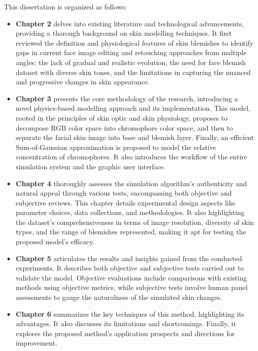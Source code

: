 \begin{spacing}{1.5}
This dissertation is organized as follows:
\begin{itemize}
    \item \textbf{Chapter 2} delves into existing literature and technological advancements, providing a thorough background on skin modelling techniques. It first reviewed the definition and physiological features of skin blemishes to identify gaps in current face image editing and retouching approaches from multiple angles: the lack of gradual and realistic evolution, the need for face blemish dataset with diverse skin tones, and the limitations in capturing the nuanced and progressive changes in skin appearance.
    \item \textbf{Chapter 3} presents the core methodology of the research, introducing a novel physics-based modelling approach and its implementation. This model, rooted in the principles of skin optic and skin physiology, proposes to decompose RGB color space into chromophore color space, and then to separate the facial skin image into base and blemish layer. Finally, an efficient Sum-of-Gaussian approximation is proposed to model the relative concentration of chromophores. It also introduces the workflow of the entire simulation system and the graphic user interface.
    \item \textbf{Chapter 4} thoroughly assesses the simulation algorithm's authenticity and natural appeal through various tests, encompassing both objective and subjective reviews. This chapter details experimental design aspects like parameter choices, data collections, and methodologies. It also highlighting the dataset's comprehensiveness in terms of image resolution, diversity of skin types, and the range of blemishes represented, making it apt for testing the proposed model's efficacy.
    \item \textbf{Chapter 5} articulates the results and insights gained from the conducted experiments. It describes both objective and subjective tests carried out to validate the model. Objective evaluations include comparisons with existing methods using objective metrics, while subjective tests involve human panel assessments to gauge the naturalness of the simulated skin changes.
    \item \textbf{Chapter 6} summarizes the key techniques of this method, highlighting its advantages. It also discusses its limitations and shortcomings. Finally, it explores the proposed method's application prospects and directions for improvement.
\end{itemize}

\end{spacing}
\newpage


